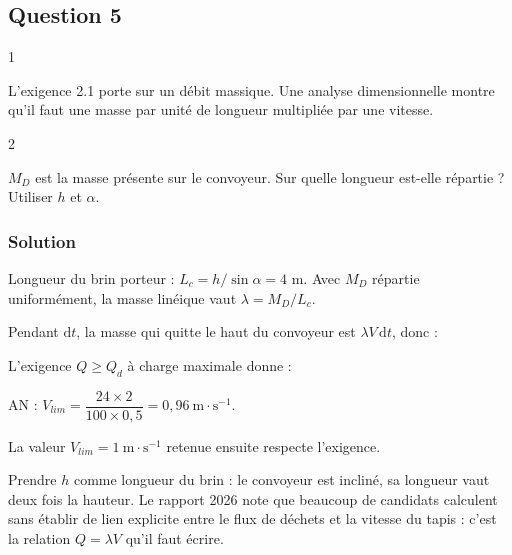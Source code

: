 \documentclass[11pt,a4paper]{article}
\newcommand{\equationajustee}[1]{%
  \sbox{\boiteequation}{$\displaystyle #1$}%
  \ifdim\wd\boiteequation>\linewidth
    \[\resizebox{\linewidth}{!}{\usebox{\boiteequation}}\]%
  \else
    \[#1\]%
  \fi}
\begin{document}
\hypertarget{question-5}{%
\subsection{Question 5}\label{question-5}}

\begin{indication}{1}

L'exigence 2.1 porte sur un débit massique. Une analyse dimensionnelle montre qu'il faut une masse par unité de longueur multipliée par une vitesse.

\end{indication}

\begin{indication}{2}

\(M_D\) est la masse présente sur le convoyeur. Sur quelle longueur est-elle répartie ? Utiliser \(h\) et \(\alpha\).

\end{indication}

\hypertarget{solution-4}{%
\subsubsection{Solution}\label{solution-4}}

Longueur du brin porteur : \(L_c=h/\sin\alpha=4\) m. Avec \(M_D\) répartie uniformément, la masse linéique vaut \(\lambda=M_D/L_c\).

Pendant \(\mathrm dt\), la masse qui quitte le haut du convoyeur est \(\lambda V\,\mathrm dt\), donc :

\equationajustee{Q=\lambda V=\frac{M_D\,V\sin\alpha}{h}}

L'exigence \(Q\ge Q_d\) à charge maximale donne :

\equationajustee{\boxed{V_{lim}=\frac{Q_d\,h}{M_D\sin\alpha}}}

AN : \(V_{lim}=\dfrac{24\times2}{100\times0{,}5}=0{,}96\ \mathrm{m\cdot s^{-1}}\).

La valeur \(V_{lim}=1\ \mathrm{m\cdot s^{-1}}\) retenue ensuite respecte l'exigence.

\begin{piege}

Prendre \(h\) comme longueur du brin : le convoyeur est incliné, sa longueur vaut deux fois la hauteur. Le rapport 2026 note que beaucoup de candidats calculent sans établir de lien explicite entre le flux de déchets et la vitesse du tapis : c'est la relation \(Q=\lambda V\) qu'il faut écrire.

\end{piege}
\end{document}
